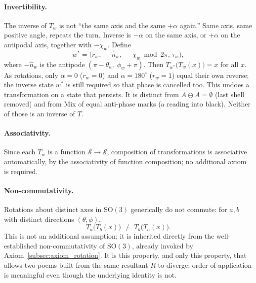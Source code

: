 \documentclass[12pt, a4paper]{article}
\begin{document}
\paragraph{Invertibility.}
The inverse of $T_w$ is not ``the same axis and the same $+\alpha$ again.'' Same axis, same positive angle, repeats the turn. Inverse is $-\alpha$ on the same axis, or $+\alpha$ on the antipodal axis, together with $-\chi_w$. Define
\begin{equation}
    w^{*} = \bigl(r_w,\,-\hat n_w,\,-\chi_w \bmod 2\pi,\,\tau_w\bigr),
\end{equation}
where $-\hat n_w$ is the antipode $(\pi-\theta_w,\,\phi_w+\pi)$.
Then $T_{w^{*}}\!\big(T_w(x)\big) = x$ for all $x$. As rotations, only $\alpha=0$ ($r_w=0$) and $\alpha=180^\circ$ ($r_w=1$) equal their own reverse; the inverse state $w^{*}$ is still required so that phase is cancelled too. This undoes a transformation on a state that persists. It is distinct from $A\ominus A=\emptyset$ (last shell removed) and from Mix of equal anti-phase marks (a reading into black). Neither of those is an inverse of $T$.

\paragraph{Associativity.} Since each $T_w$ is a function
$\mathcal{S} \to \mathcal{S}$, composition of transformations is
associative automatically, by the associativity of function
composition; no additional axiom is required.

\paragraph{Non-commutativity.} Rotations about distinct axes in
$\mathrm{SO}(3)$ generically do not commute: for $a, b$ with distinct
directions $(\theta,\phi)$,
\begin{equation}
    T_a\big(T_b(x)\big) \;\neq\; T_b\big(T_a(x)\big).
    \label{eq:noncommute}
\end{equation}
This is not an additional assumption; it is inherited directly from
the well-established non-commutativity of $\mathrm{SO}(3)$, already
invoked by Axiom~\ref{subsec:axiom_rotation}. It is this property,
and only this property, that allows two poems built from the same
resultant $R$ to diverge: order of application is meaningful even
though the underlying identity is not.
\end{document}
